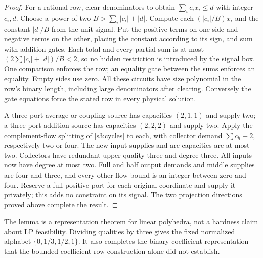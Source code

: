 \begin{proof}
For a rational row, clear denominators to obtain
$\sum_i c_ix_i\le d$ with integer $c_i,d$. Choose a power of two
$B>\sum_i|c_i|+|d|$. Compute each $(|c_i|/B)x_i$ and the constant
$|d|/B$ from the unit signal. Put the positive terms on one side and
negative terms on the other, placing the constant according to its sign,
and sum with addition gates. Each total and every partial sum is at
most $(2\sum|c_i|+|d|)/B<2$, so no hidden restriction is introduced
by the signal box. One comparison enforces the row; an equality gate
between the sums enforces an equality. Empty sides use zero. All these
circuits have size polynomial in the row's binary length, including
large denominators after clearing. Conversely the gate equations force
the stated row in every physical solution.

A three-port average or coupling source has capacities $(2,1,1)$ and
supply two; a three-port addition source has capacities $(2,2,2)$ and
supply two. Apply the complement-flow splitting of \cref{s3:cycles}
to each, with collector demand $\sum c_h-2$, respectively two or four.
The new input supplies and arc capacities are at most two. Collectors
have redundant upper quality three and degree three. All inputs now
have degree at most two. Full and half output demands and middle
supplies are four and three, and every other flow bound is an integer
between zero and four. Reserve a full positive port for each original
coordinate and supply it privately; this adds no constraint on its
signal. The two projection directions proved above complete the result.
\end{proof}

The lemma is a representation theorem for linear polyhedra, not a
hardness claim about LP feasibility. Dividing qualities by three gives
the fixed normalized alphabet $\{0,1/3,1/2,1\}$. It also completes the
binary-coefficient representation that the bounded-coefficient row
construction alone did not establish.

